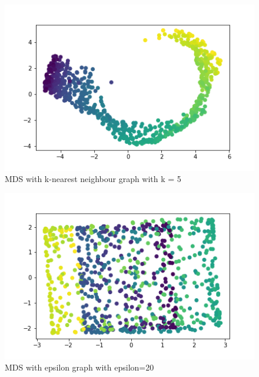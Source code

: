 \begin{figure}[H]
\begin{center}   
\includegraphics[width=1\textwidth]{k.png}
\caption{MDS with k-nearest neighbour graph with k = 5}
\end{center}
\end{figure}


\begin{figure}[H]
\begin{center}   
\includegraphics[width=1\textwidth]{epsilon.png}
\caption{MDS with epsilon graph with epsilon=20}
\end{center}
\end{figure}

